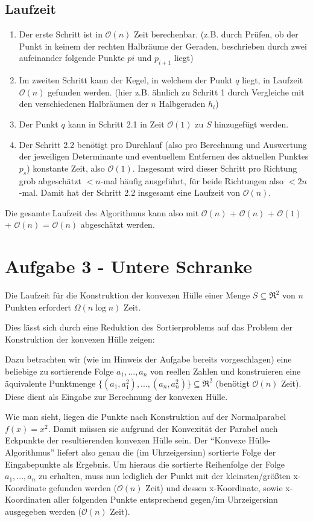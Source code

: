 \documentclass[a4paper]{article}
\begin{document}
\subsection*{Laufzeit}
\begin{enumerate}
\item Der erste Schritt ist in $\mathcal{O}(n)$ Zeit berechenbar. (z.B. durch
Prüfen, ob der Punkt in keinem der rechten Halbräume der Geraden, beschrieben durch
zwei aufeinander folgende Punkte $pi$ und $p_{i+1}$ liegt)
\item Im zweiten Schritt kann der Kegel, in welchem der Punkt $q$ liegt, in Laufzeit
$\mathcal{O}(n)$ gefunden werden. (hier z.B. ähnlich zu Schritt 1 durch Vergleiche 
mit den verschiedenen Halbräumen der $n$ Halbgeraden $h_i$)
\item Der Punkt $q$ kann in Schritt 2.1 in Zeit $\mathcal{O}(1)$ zu $S$ hinzugefügt werden.
\item Der Schritt 2.2 benötigt pro Durchlauf (also pro Berechnung und Auswertung der jeweiligen
Determinante und eventuellem Entfernen des aktuellen Punktes $p_s$) konstante Zeit, also $\mathcal{O}(1)$. Insgesamt wird dieser Schritt pro Richtung grob abgeschätzt $< n$-mal häufig ausgeführt, für beide Richtungen also $< 2n$-mal. Damit hat der Schritt 2.2 insgesamt eine Laufzeit von $\mathcal{O}(n)$.
\end{enumerate}

Die gesamte Laufzeit des Algorithmus kann also mit $\mathcal{O}(n)$ + $\mathcal{O}(n)$ + $\mathcal{O}(1)$ + $\mathcal{O}(n)$ = $\mathcal{O}(n)$ abgeschätzt werden. 



\section*{Aufgabe 3 - Untere Schranke}
Die Laufzeit für die Konstruktion der konvexen Hülle einer Menge $S \subseteq \Re^2$ von $n$ 
Punkten erfordert $\Omega(n \log n)$ Zeit. 

Dies lässt sich durch eine Reduktion des Sortierproblems auf das Problem der Konstruktion der konvexen Hülle zeigen:

Dazu betrachten wir (wie im Hinweis der Aufgabe bereits vorgeschlagen) eine beliebige zu sortierende
Folge $a_1, ..., a_n$ von reellen Zahlen und konstruieren eine äquivalente Punktmenge $\{(a_1,a_1^2),...,(a_n,a_n^2)\} \subseteq \Re^2$ (benötigt $\mathcal{O}(n)$ Zeit). 
Diese dient als Eingabe zur Berechnung der konvexen Hülle.

Wie man sieht, liegen die Punkte nach Konstruktion auf der 
Normalparabel $f(x) = x^2$. Damit müssen sie aufgrund der Konvexität der Parabel auch Eckpunkte der 
resultierenden konvexen Hülle sein. Der "`Konvexe Hülle-Algorithmus"' liefert also genau
die (im Uhrzeigersinn) sortierte Folge der Eingabepunkte als Ergebnis. 
Um hieraus die sortierte Reihenfolge der Folge $a_1, ..., a_n$ zu erhalten, muss nun lediglich
der Punkt mit der kleinsten/größten x-Koordinate gefunden werden ($\mathcal{O}(n)$ Zeit) und dessen x-Koordinate, sowie x-Koordinaten aller folgenden Punkte entsprechend gegen/im Uhrzeigersinn ausgegeben werden ($\mathcal{O}(n)$ Zeit).
\end{document}
